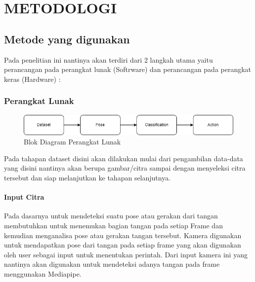 \section{METODOLOGI}


\subsection{Metode yang digunakan}

Pada penelitian ini nantinya akan terdiri dari 2 langkah utama yaitu perancangan pada perangkat lunak (Softrware) dan perancangan pada perangkat keras (Hardware) :

\subsubsection{Perangkat Lunak}

\begin{figure}[!htbp]
	\centering
	\includegraphics[width=1\linewidth]{gambar/gambar3.1}
	\caption{Blok Diagram Perangkat Lunak}
	\label{fig:Gambar 3.1}
\end{figure}

Pada tahapan dataset disini akan dilakukan mulai dari pengambilan data-data yang disini nantinya akan berupa gambar/citra sampai dengan menyeleksi citra tersebut dan siap melanjutkan ke tahapan selanjutnya.

\paragraph{Input Citra}
Pada dasarnya untuk mendeteksi suatu pose atau gerakan dari tangan membutuhkan untuk menemukan bagian tangan pada setiap Frame dan kemudian menganalisa pose atau gerakan tangan tersebut. Kamera digunakan untuk mendapatkan pose dari tangan pada setiap frame yang akan digunakan oleh user sebagai input untuk menentukan perintah. Dari input kamera ini yang nantinya akan digunakan untuk mendeteksi adanya tangan pada frame menggunakan Mediapipe.

